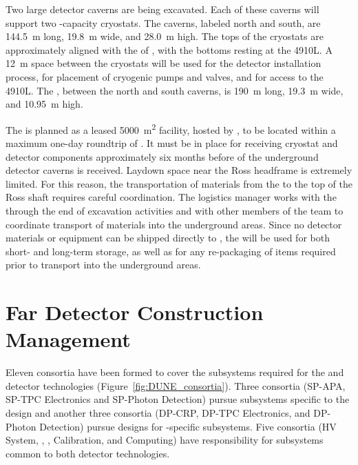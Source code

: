 Two large detector caverns
are being excavated.  Each of these caverns will support two
\larmass{}-capacity cryostats.  The caverns, labeled north and
south, are \SI{144.5}{\meter} long, \SI{19.8}{\meter} wide,  and 
\SI{28.0}{\meter} high. The tops of the cryostats are approximately
aligned with the  of , with the bottoms resting
at the 4910L.  A \SI{12}{\meter} space between the cryostats will
be used %
for the detector installation process, for placement of
cryogenic pumps and valves, and for access to the 4910L.  The
, between the north and south caverns, is \SI{190}{\meter}
long, \SI{19.3}{\meter} wide, and \SI{10.95}{\meter} high. 

The  is planned as a leased \SI{5000}{\square\meter} facility, hosted by 
, to be located within a maximum one-day roundtrip of .  
It must be in place for receiving cryostat and detector 
components approximately six months before 
of the underground detector caverns is received. 
 Laydown space near the Ross headframe is extremely 
limited.  For this reason, the transportation of materials from 
the  to the top of the Ross shaft requires careful 
coordination. The  logistics manager works 
with the  through the end of excavation activities  
and with other members of the  team to coordinate transport 
of materials into the underground areas.  Since no detector materials or 
equipment can be shipped directly to , %
the  will be used for both short- and long-term storage, as 
well as for any re-packaging of items required prior to transport 
into the underground areas. 


\section{Far Detector Construction Management}
\label{sec:es-tc-det-mgmt}


Eleven  consortia have been formed to cover 
the subsystems required for the  and  detector technologies  (Figure~\ref{fig:DUNE_consortia}). %
Three consortia (SP-APA, SP-TPC
Electronics and SP-Photon Detection) pursue subsystems specific to
the  design and another three consortia (DP-CRP, DP-TPC
Electronics, and DP-Photon Detection) pursue designs for -specific 
subsystems.  %
Five consortia (HV System, ,
, Calibration, and Computing)
have responsibility for subsystems common to both detector
technologies.    

